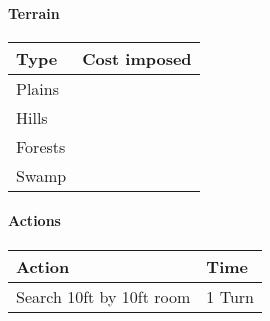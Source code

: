 \paragraph{Terrain}
\begin{tabular}{l l}
    Type & Cost imposed \\
    \hline
    Plains & \\
    Hills & \\
    Forests & \\
    Swamp & \\
    
\end{tabular}

\paragraph{Actions}
\begin{tabular}{l l}
    Action & Time \\
    \hline
    Search 10ft by 10ft room & 1 Turn \\
    
\end{tabular}


